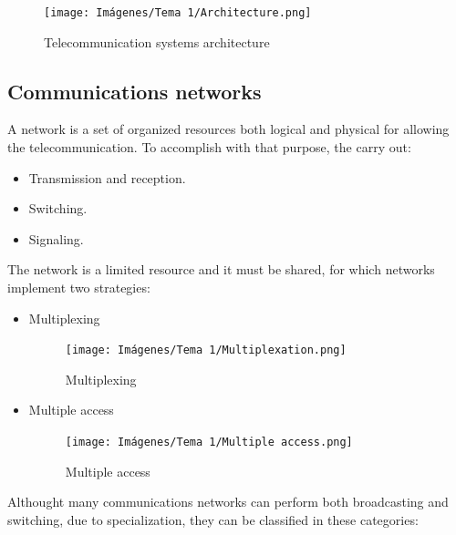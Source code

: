 \documentclass[
	12pt,
	twoside
]{book}
\begin{document}
\begin{figure}[H]
	\centering
	\texttt{[image: Imágenes/Tema 1/Architecture.png]}
	\caption{
		\label{fig:unit1_arch}
		Telecommunication systems architecture
	}
\end{figure}

\subsection{Communications networks}

A network is a set of organized resources both logical and physical for allowing the telecommunication. To accomplish with that purpose, the carry out:

\begin{itemize}
	\item Transmission and reception.
	\item Switching.
	\item Signaling.
\end{itemize}

The network is a limited resource and it must be shared, for which networks implement two strategies:

\begin{itemize}
	\item {
		Multiplexing

		\begin{figure}[H]
			\centering
			\texttt{[image: Imágenes/Tema 1/Multiplexation.png]}
			\caption{
				\label{fig:unit1_muiltiplexation}
				Multiplexing
			}
		\end{figure}
	}
	\item {
		Multiple access

		\begin{figure}[H]
			\centering
			\texttt{[image: Imágenes/Tema 1/Multiple access.png]}
			\caption{
				\label{fig:unit1_multiple}
				Multiple access
			}
		\end{figure}
	}
\end{itemize}

Althought many communications networks can perform both broadcasting and switching, due to specialization, they can be classified in these categories:
\end{document}
